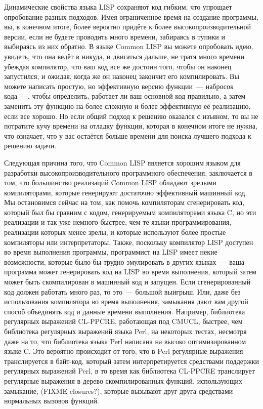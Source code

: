 Динамические свойства языка LISP сохраняют код гибким, что упрощает опробование разных
подходов. Имея ограниченное время на создание программы, вы, в конечном итоге, более
вероятно придёте к более высокопроизводительной версии, если не будете проводить много
времени, забираясь в тупики и выбираясь из них обратно. В языке Common LISP вы можете
опробовать идею, увидеть, что она ведёт в никуда, и двигаться дальше, не тратя много
времени убеждая компилятор, что ваш код все же достоин того, чтобы он наконец запустился,
и ожидая, когда же он наконец закончит его компилировать. Вы можете написать простую, но
эффективную версию функции~--- набросок кода~---, чтобы определить, работает ли ваш
основной код правильно, а затем заменить эту функцию на более сложную и более эффективную
её реализацию, если все хорошо. Но если общий подход к решению оказался с изъяном, то вы
не потратите кучу времени на отладку функции, которая в конечном итоге не нужна, что
означает, что у вас остаётся больше времени для поиска лучшего подхода к решению задачи.

Следующая причина того, что Common LISP является хорошим языком для разработки
высокопроизводительного программного обеспечения, заключается в том, что большинство
реализаций Common LISP обладают зрелыми компиляторами, которые генерируют достаточно
эффективный машинный код. Мы остановимся сейчас на том, как помочь компиляторам
сгенерировать код, который был бы сравним с кодом, генерируемым компиляторами языка C, но
эти реализации и так уже немного быстрее, чем те языки программирования, реализации
которых менее зрелы, и которые используют более простые компиляторы или
интерпретаторы. Также, поскольку компилятор LISP доступен во время выполнения программы,
программист на LISP имеет некие возможности, которые было бы трудно эмулировать в других
языках~--- ваша программа может генерировать код на LISP во время выполнения, который затем
может быть скомпилирован в машинный код и запущен. Если сгенерированный код должен
работать много раз, то это~--- большой выигрыш. Или, даже без использования компилятора во
время выполнения, замыкания дают вам другой способ объединять код и данные времени
выполнения. Например, библиотека регулярных выражений CL-PPCRE, работающая под CMUCL,
быстрее, чем библиотека регулярных выражений языка Perl, на некоторых тестах, несмотря
даже на то, что библиотека языка Perl написана на высоко оптимизированном языке C. Это
вероятно происходит от того, что в Perl регулярные выражения транслируется в байт-код,
который затем интерпретируется средствами поддержки регулярных выражений Perl, в то время
как библиотека CL-PPCRE транслирует регулярные выражения в дерево скомпилированных
функций, использующих замыкание, (FIXME closures?), которые вызывают друг друга средствами
нормальных вызовов функций.

